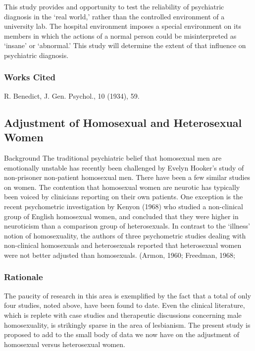 This study provides and opportunity to test the reliability of psychiatric diagnosis in the `real world,' rather than the controlled environment of a university lab. The hospital environment imposes a special environment on its members in which the actions of a normal person could be misinterpreted as `insane' or `abnormal.' This study will determine the extent of that influence on psychiatric diagnosis.

\subsubsection{Works Cited}
\label{workscited}

R. Benedict, J. Gen. Psychol., 10 (1934), 59.

\newpage

\subsection{Adjustment of Homosexual and Heterosexual Women}
\label{adjustmentofhomosexualandheterosexualwomen}

Background The traditional psychiatric belief that homosexual men are emotionally unstable has recently been challenged by Evelyn Hooker's study of non-prisoner non-patient homosexual men. There have been a few similar studies on women. The contention that homosexual women are neurotic has typically been voiced by clinicians reporting on their own patients. One exception is the recent psychometric investigation by Kenyon (1968) who studied a non-clinical group of English homosexual women, and concluded that they were higher in neuroticism than a comparison group of heterosexuals. In contrast to the `illness' notion of homosexuality, the authors of three psychometric studies dealing with non-clinical homosexuals and heterosexuals reported that heterosexual women were not better adjusted than homosexuals. (Armon, 1960; Freedman, 1968;

\subsubsection{Rationale}
\label{rationale}

The paucity of research in this area is exemplified by the fact that a total of only four studies, noted above, have been found to date. Even the clinical literature, which is replete with case studies and therapeutic discussions concerning male homosexuality, is strikingly sparse in the area of lesbianism. The present study is proposed to add to the small body of data we now have on the adjustment of homosexual versus heterosexual women.

